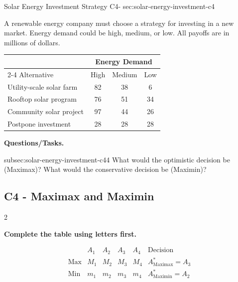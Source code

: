 	\sectionScored
	{Solar Energy Investment Strategy}
	{C4-}
	{sec:solar-energy-investment-c4}
	{
		A renewable energy company must choose a strategy for investing in a new
		market. Energy demand could be high, medium, or low. All payoffs are in
		millions of dollars.
		
			\begin{center}
			\renewcommand{\arraystretch}{1.3}
			\small
			\begin{tabular}{lccc}
				\toprule
				& \multicolumn{3}{c}{Energy Demand} \\
				\cmidrule(lr){2-4}
				Alternative & High & Medium & Low \\
				\midrule
				Utility-scale solar farm & 82 & 38 & 6 \\
				Rooftop solar program & 76 & 51 & 34 \\
				Community solar project & 97 & 44 & 26 \\
				Postpone investment & 28 & 28 & 28 \\
				\bottomrule
			\end{tabular}
		\end{center}
		\vspace{-5mm}
		
		\textbf{Questions/Tasks.}
		\begin{enumerate}
			\CriterionTask
			{subsec:solar-energy-investment-c4}{4}
			{What would the optimistic decision be (Maximax)? What would the conservative decision be (Maximin)? }
		\end{enumerate}
		
		\label{subsec:solar-energy-investment-c4}
		\subsection*{C4 - Maximax and Maximin }
		
		
		\begin{multicols}{2}
			
			\textbf{Complete the table using letters first.}
			
			\[
			\begin{array}{c|ccccc}
				& A_1 & A_2 & A_3 & A_4 & \text{Decision}\\
				\hline
				\text{Max} &
				M_1 & M_2 & M_3 & M_4 &
				A^*_{\mathrm{Maximax}}=A_3
				\\
				\text{Min} &
				m_1 & m_2 & m_3 & m_4 &
				A^*_{\mathrm{Maximin}}=A_2
			\end{array}
			\]
			

\end{multicols}}
